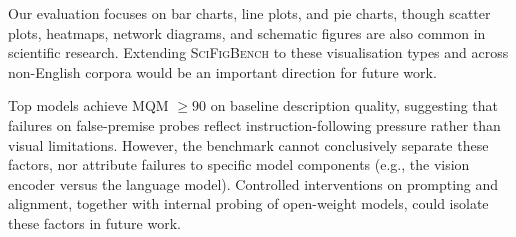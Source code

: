 



Our evaluation focuses on bar charts, line plots, and pie charts, though scatter plots, heatmaps, network diagrams, and schematic figures are also common in scientific research. Extending \textsc{SciFigBench} to these visualisation types and across non-English corpora would be an important direction for future work.

Top models achieve MQM $\geq 90$ on baseline description quality, suggesting that failures on false-premise probes reflect instruction-following pressure rather than visual limitations. However, the benchmark cannot conclusively separate these factors, nor attribute failures to specific model components (e.g., the vision encoder versus the language model). Controlled interventions on prompting and alignment, together with internal probing of open-weight models, could isolate these factors in future work.

